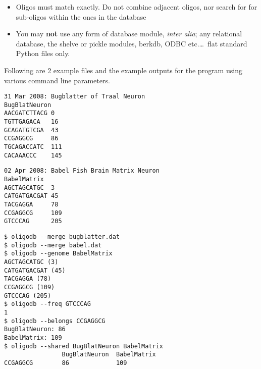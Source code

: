 \begin{enumerate}
\begin{itemize}
	\item Oligos must match exactly. Do not combine adjacent oligos, nor search for for sub-oligos within the ones in the database
	\item You may \textbf{not} use any form of database module, \textit{inter alia}; any relational database, the shelve or pickle modules, berkdb, ODBC etc.\ldots\ flat standard Python files only.
\end{itemize}     Following are 2 example files and the example outputs for the    program using various command line parameters.  
\begin{lstlisting}
31 Mar 2008: Bugblatter of Traal Neuron
BugBlatNeuron
AACGATCTTACG 0
TGTTGAGACA   16
GCAGATGTCGA  43
CCGAGGCG     86
TGCAGACCATC  111
CACAAACCC    145\end{lstlisting}
\begin{lstlisting}
02 Apr 2008: Babel Fish Brain Matrix Neuron
BabelMatrix
AGCTAGCATGC  3
CATGATGACGAT 45
TACGAGGA     78
CCGAGGCG     109
GTCCCAG      205\end{lstlisting}
\begin{lstlisting}
$ oligodb --merge bugblatter.dat
$ oligodb --merge babel.dat
$ oligodb --genome BabelMatrix
AGCTAGCATGC (3)
CATGATGACGAT (45)
TACGAGGA (78)
CCGAGGCG (109)
GTCCCAG (205)
$ oligodb --freq GTCCCAG
1
$ oligodb --belongs CCGAGGCG
BugBlatNeuron: 86
BabelMatrix: 109
$ oligodb --shared BugBlatNeuron BabelMatrix
                BugBlatNeuron  BabelMatrix
CCGAGGCG        86             109\end{lstlisting}
\end{enumerate}

